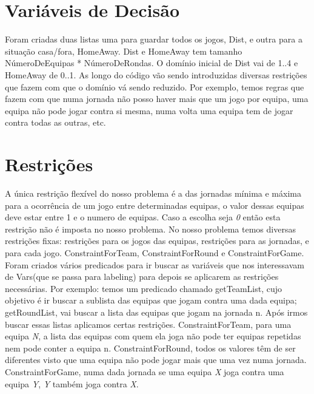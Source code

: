\documentclass[runningheads,a4paper]{llncs}
\begin{document}
\section{Variáveis de Decisão}
Foram criadas duas listas uma para guardar todos os jogos, Dist, e outra para a situação casa/fora, HomeAway. Dist e HomeAway tem tamanho NúmeroDeEquipas * NúmeroDeRondas. O domínio inicial de Dist vai de 1..4 e HomeAway de 0..1. As longo do código vão sendo introduzidas diversas restrições que fazem com que o domínio vá sendo reduzido. Por exemplo, temos regras que fazem com que numa jornada não posso haver mais que um jogo por equipa, uma equipa não pode jogar contra si mesma, numa volta uma equipa tem de jogar contra todas as outras, etc.

\section{Restrições}
A única restrição flexível do nosso problema é a das jornadas mínima e máxima para a ocorrência de um jogo entre determinadas equipas, o valor dessas equipas deve estar entre 1 e o numero de equipas. Caso a escolha seja \textit{0} então esta restrição não é imposta no nosso problema. No nosso problema temos diversas restrições fixas: restrições para os jogos das equipas, restrições para as jornadas, e para cada jogo. ConstraintForTeam, ConstraintForRound e ConstraintForGame. Foram criados vários predicados para ir buscar as variáveis que nos interessavam de Vars(que se passa para labeling) para depois se aplicarem as restrições necessárias. Por exemplo: temos um predicado chamado getTeamList, cujo objetivo é ir buscar a sublista das equipas que jogam contra uma dada equipa; getRoundList, vai buscar a lista das equipas que jogam na jornada n. Após irmos buscar essas listas aplicamos certas restrições. ConstraintForTeam, para uma equipa \textit{N}, a lista das equipas com quem ela joga não pode ter equipas repetidas nem pode conter a equipa n. ConstraintForRound, todos os valores têm de ser diferentes visto que uma equipa não pode jogar mais que uma vez numa jornada. ConstraintForGame, numa dada jornada se uma equipa \textit{X} joga contra uma equipa \textit{Y}, \textit{Y} também joga contra \textit{X}.

\newpage
\end{document}
